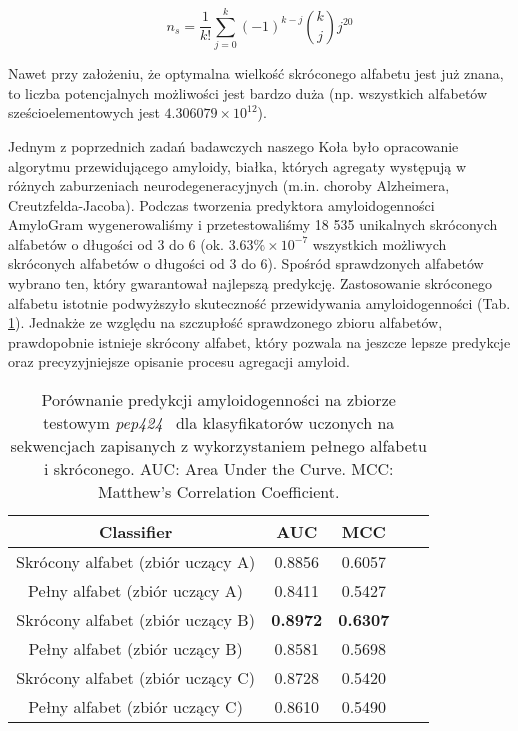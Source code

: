 \documentclass{article}
\begin{document}
$$ n_s = \frac{1}{k!} \sum^{k}_{j = 0} (-1)^{k-j}  {k \choose j} j^{20} $$

Nawet przy założeniu, że optymalna wielkość skróconego alfabetu jest już znana, 
to liczba potencjalnych możliwości jest bardzo duża (np. wszystkich alfabetów 
sześcioelementowych jest $4.306079 \times 10^{12}$).

Jednym z poprzednich zadań badawczych naszego Koła było opracowanie algorytmu 
przewidującego amyloidy, białka, których agregaty występują w różnych 
zaburzeniach neurodegeneracyjnych (m.in. choroby Alzheimera, 
Creutzfelda-Jacoba). Podczas tworzenia predyktora amyloidogenności AmyloGram 
wygenerowaliśmy i przetestowaliśmy 18 535 unikalnych skróconych alfabetów o 
długości od 3 do 6 (ok. $3.63\% \times 10^{-7} $ wszystkich możliwych skróconych 
alfabetów o długości od 3 do 6). Spośród sprawdzonych alfabetów wybrano ten, 
który gwarantował najlepszą predykcję. Zastosowanie skróconego alfabetu 
istotnie podwyższyło skuteczność przewidywania amyloidogenności (Tab. 
\ref{tab:alfabety}). Jednakże ze względu na szczupłość sprawdzonego zbioru 
alfabetów, prawdopobnie istnieje skrócony alfabet, który pozwala na jeszcze 
lepsze predykcje oraz precyzyjniejsze opisanie procesu agregacji amyloid.


\begin{table}[ht]
\centering
\small
\caption{Porównanie predykcji amyloidogenności na zbiorze testowym 
\textit{pep424}~\citep{walsh_pasta_2014} dla klasyfikatorów uczonych na 
sekwencjach zapisanych z wykorzystaniem pełnego alfabetu i skróconego. AUC: Area 
Under the Curve. MCC: Matthew's Correlation Coefficient.} 
\label{tab:alfabety}
\begin{tabular}{ccccc}
  \toprule
Classifier & AUC & MCC  \\ 
  \midrule
Skrócony alfabet (zbiór uczący A) & 0.8856 & 0.6057  \\
   \rowcolor[gray]{0.85}Pełny alfabet (zbiór uczący A) & 0.8411 & 0.5427 \\ 

Skrócony alfabet (zbiór uczący B) & \textbf{0.8972} & \textbf{0.6307}  \\ 
  \rowcolor[gray]{0.85}Pełny alfabet (zbiór uczący B) & 0.8581 & 0.5698 
\\ 
Skrócony alfabet (zbiór uczący C) & 0.8728 & 0.5420 
\\
   \rowcolor[gray]{0.85}Pełny alfabet (zbiór uczący C) & 0.8610 & 0.5490 & \\
   \bottomrule
\end{tabular}
\end{table}
\end{document}
